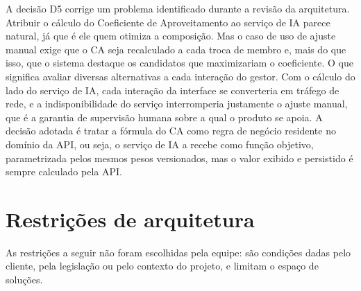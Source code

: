 \documentclass[a4paper,12pt,oneside,openany]{book}
\newif\iforientacoes
\newcommand{\orientacao}[1]{%
    \iforientacoes
        \begin{quote}
        \small\itshape\textbf{Orientação:} #1
        \end{quote}
    \fi
}
\begin{document}
A decisão D5 corrige um problema identificado durante a revisão da
arquitetura. Atribuir o cálculo do Coeficiente de Aproveitamento ao serviço de
IA parece natural, já que é ele quem otimiza a composição. Mas o caso de uso de
ajuste manual exige que o CA seja recalculado a cada troca de membro e, mais do
que isso, que o sistema destaque os candidatos que maximizariam o coeficiente.
O que significa avaliar diversas alternativas a cada interação do gestor.
Com o cálculo do lado do serviço de IA, cada interação da interface se
converteria em tráfego de rede, e a indisponibilidade do serviço interromperia
justamente o ajuste manual, que é a garantia de supervisão humana sobre a qual
o produto se apoia. A decisão adotada é tratar a fórmula do CA como regra de
negócio residente no domínio da API, ou seja, o serviço de IA a recebe como função
objetivo, parametrizada pelos mesmos pesos versionados, mas o valor exibido e
persistido é sempre calculado pela API.

\FloatBarrier

\section{Restrições de arquitetura}\label{sec:restricoes-arq}

\orientacao{Registrem restrições que limitem as decisões de arquitetura ou
implementação, como tecnologias obrigatórias, integrações com sistemas
existentes, ambiente de execução, restrições organizacionais ou convenções.
Incluam apenas restrições efetivamente relevantes ao projeto.}

As restrições a seguir não foram escolhidas pela equipe: são condições dadas
pelo cliente, pela legislação ou pelo contexto do projeto, e limitam o espaço
de soluções.
\end{document}
